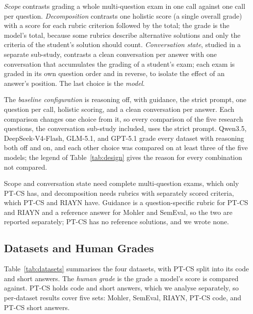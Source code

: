 \emph{Scope} contrasts grading a whole multi-question exam in one call against one call per question.
\emph{Decomposition} contrasts one holistic score (a single overall grade) with a score for each rubric criterion
followed by the total; the grade is the model's total, because some rubrics describe alternative solutions and
only the criteria of the student's solution should count. \emph{Conversation state}, studied in a separate
sub-study, contrasts a clean conversation per answer with one conversation that accumulates the grading of a
student's exam; each exam is graded in its own question order and in reverse, to isolate the effect of an
answer's position. The last choice is the \emph{model}.


The \emph{baseline configuration} is reasoning off, with guidance, the strict prompt, one question per call,
holistic scoring, and a clean conversation per answer. Each comparison changes one choice from it, so every
comparison of the five research questions, the conversation sub-study included, uses the strict prompt.
Qwen3.5, DeepSeek-V4-Flash, GLM-5.1, and GPT-5.1 grade every dataset with reasoning both off and on, and each
other choice was compared on at least three of the five models; the legend of Table~\ref{tab:design} gives the
reason for every combination not compared.

Scope and conversation state need complete multi-question exams, which only PT-CS has, and decomposition needs
rubrics with separately scored criteria, which PT-CS and RIAYN have. Guidance is a question-specific rubric for
PT-CS and RIAYN and a reference answer for Mohler and SemEval, so the two are reported separately; PT-CS has no
reference solutions, and we wrote none.

\subsection{Datasets and Human Grades}
\label{sec:datasets}

Table~\ref{tab:datasets} summarises the four datasets, with PT-CS split into its code and short answers. The \emph{human grade} is the grade a model's score is
compared against. PT-CS holds code and short answers, which we analyse separately, so per-dataset results cover
five sets: Mohler, SemEval, RIAYN, PT-CS code, and PT-CS short answers.



